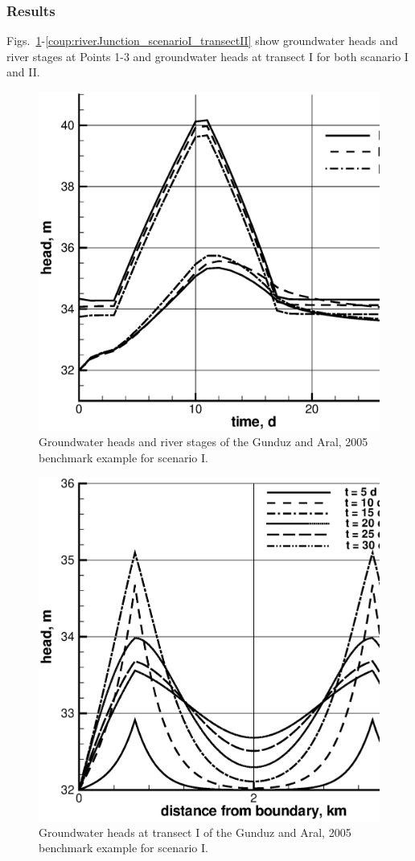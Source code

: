 \subsubsection*{Results}
%
Figs.~\ref{coup:riverJunction_scenarioI_points}-\ref{coup:riverJunction_scenarioI_transectII} show groundwater heads and river stages at Points 1-3 and groundwater heads at transect I for both
scanario I and II.
%
\begin{figure} [htb!]
 \centering
 \includegraphics[width=0.75\columnwidth] {H_COUP/figures/riverJunction_scenarioI_points.eps}
 \caption{Groundwater heads and river stages of the Gunduz and Aral, 2005 \cite{Gunduz:05} benchmark example for scenario I.}
 \label{coup:riverJunction_scenarioI_points}
\end{figure}
%
\begin{figure} [htb!]
 \centering
 \includegraphics[width=0.75\columnwidth] {H_COUP/figures/riverJunction_scenarioI_transectI.eps}
 \caption{Groundwater heads at transect I of the Gunduz and Aral, 2005 \cite{Gunduz:05} benchmark example for scenario I.}
 \label{coup:riverJunction_scenarioI_transectI}
\end{figure}
